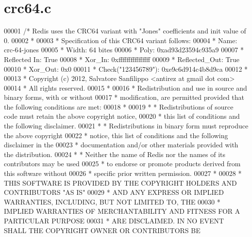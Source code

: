 \hypertarget{crc64_8c_source}{}\section{crc64.\+c}
\label{crc64_8c_source}

\begin{DoxyCode}
00001 \textcolor{comment}{/* Redis uses the CRC64 variant with "Jones" coefficients and init value of 0.}
00002 \textcolor{comment}{ *}
00003 \textcolor{comment}{ * Specification of this CRC64 variant follows:}
00004 \textcolor{comment}{ * Name: crc-64-jones}
00005 \textcolor{comment}{ * Width: 64 bites}
00006 \textcolor{comment}{ * Poly: 0xad93d23594c935a9}
00007 \textcolor{comment}{ * Reflected In: True}
00008 \textcolor{comment}{ * Xor\_In: 0xffffffffffffffff}
00009 \textcolor{comment}{ * Reflected\_Out: True}
00010 \textcolor{comment}{ * Xor\_Out: 0x0}
00011 \textcolor{comment}{ * Check("123456789"): 0xe9c6d914c4b8d9ca}
00012 \textcolor{comment}{ *}
00013 \textcolor{comment}{ * Copyright (c) 2012, Salvatore Sanfilippo <antirez at gmail dot com>}
00014 \textcolor{comment}{ * All rights reserved.}
00015 \textcolor{comment}{ *}
00016 \textcolor{comment}{ * Redistribution and use in source and binary forms, with or without}
00017 \textcolor{comment}{ * modification, are permitted provided that the following conditions are met:}
00018 \textcolor{comment}{ *}
00019 \textcolor{comment}{ *   * Redistributions of source code must retain the above copyright notice,}
00020 \textcolor{comment}{ *     this list of conditions and the following disclaimer.}
00021 \textcolor{comment}{ *   * Redistributions in binary form must reproduce the above copyright}
00022 \textcolor{comment}{ *     notice, this list of conditions and the following disclaimer in the}
00023 \textcolor{comment}{ *     documentation and/or other materials provided with the distribution.}
00024 \textcolor{comment}{ *   * Neither the name of Redis nor the names of its contributors may be used}
00025 \textcolor{comment}{ *     to endorse or promote products derived from this software without}
00026 \textcolor{comment}{ *     specific prior written permission.}
00027 \textcolor{comment}{ *}
00028 \textcolor{comment}{ * THIS SOFTWARE IS PROVIDED BY THE COPYRIGHT HOLDERS AND CONTRIBUTORS "AS IS"}
00029 \textcolor{comment}{ * AND ANY EXPRESS OR IMPLIED WARRANTIES, INCLUDING, BUT NOT LIMITED TO, THE}
00030 \textcolor{comment}{ * IMPLIED WARRANTIES OF MERCHANTABILITY AND FITNESS FOR A PARTICULAR PURPOSE}
00031 \textcolor{comment}{ * ARE DISCLAIMED. IN NO EVENT SHALL THE COPYRIGHT OWNER OR CONTRIBUTORS BE}

\end{DoxyCode}
